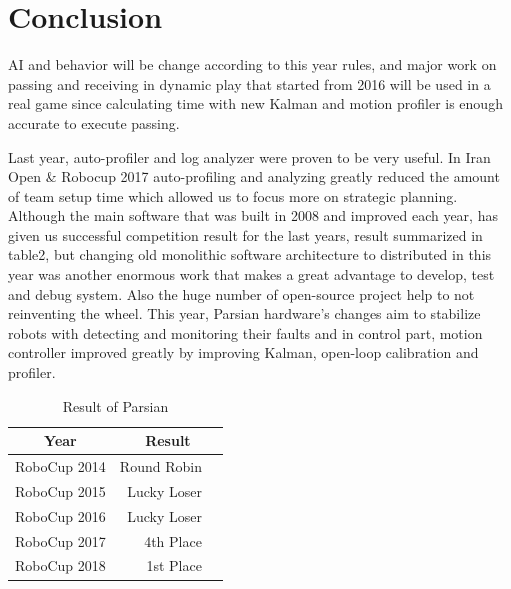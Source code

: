 \documentclass{llncs}
\begin{document}
\section{Conclusion}
         AI and behavior will be change according to this year rules, and major work on passing and receiving in dynamic play that started from 2016 will be used in a real game since calculating time with new Kalman and motion profiler is enough accurate to execute passing.
     
    Last year, auto-profiler and log analyzer were proven to be very useful. In Iran Open \& Robocup 2017 auto-profiling and analyzing greatly reduced the amount of team setup time which allowed us to focus more on strategic planning. Although the main software that was built in 2008 and improved each year, has given us successful competition result for the last years, result summarized in table2, but changing old monolithic software architecture to distributed in this year was another enormous work that makes a great advantage to develop, test and debug system. Also the huge number of open-source project help to not reinventing the wheel. This year, Parsian hardware's changes aim to stabilize robots with detecting and monitoring their faults and in control part, motion controller improved greatly by improving Kalman, open-loop calibration and profiler.


\begin{table}
\caption{Result of Parsian}
\begin{center}
\begin{tabular}{r@{\quad}rl}
\hline
\multicolumn{1}{c}{\rule{0pt}{12pt}Year} & \multicolumn{2}{c}{Result}\\[2pt]
\hline\rule{0pt}{12pt}
RoboCup 2014  &     Round Robin& \\
RoboCup 2015  &     Lucky Loser& \\
RoboCup 2016  &     Lucky Loser& \\
RoboCup 2017  &     4th Place  & \\
RoboCup 2018  & 	1st Place  & \\[2pt]
\hline
\end{tabular}
\end{center}
\end{table}
%
%
\end{document}
